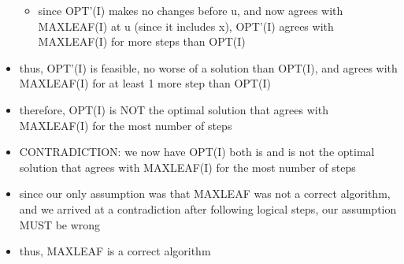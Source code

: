 \documentclass[a4paper]{article}
\begin{document}
\begin{itemize}
\begin{itemize}
\begin{itemize}
        \end{itemize}
        \item since OPT'(I) makes no changes before u, and now agrees with MAXLEAF(I) at u (since it includes x), OPT'(I) agrees with MAXLEAF(I) for more steps than OPT(I)
    \end{itemize}
    \item thus, OPT'(I) is feasible, no worse of a solution than OPT(I), and agrees with MAXLEAF(I) for at least 1 more step than OPT(I)
    \item therefore, OPT(I) is NOT the optimal solution that agrees with MAXLEAF(I) for the most number of steps
    \item CONTRADICTION: we now have OPT(I) both is and is not the optimal solution that agrees with MAXLEAF(I) for the most number of steps
    \item since our only assumption was that MAXLEAF was not a correct algorithm, and we arrived at a contradiction after following logical steps, our assumption MUST be wrong
    \item thus, MAXLEAF is a correct algorithm
    
\end{itemize}
\end{document}

